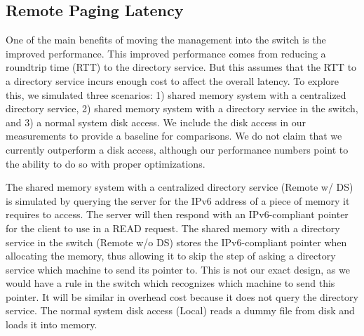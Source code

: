 \subsection{Remote Paging Latency}
One of the main benefits of moving the management into the switch is the improved performance. This improved performance comes from reducing a roundtrip time (RTT) to the directory service. But this assumes that the RTT to a directory service incurs enough cost to affect the overall latency. To explore this, we simulated three scenarios: 1) shared memory system with a centralized directory service, 2) shared memory system with a directory service in the switch, and 3) a normal system disk access. We include the disk access in our measurements to provide a baseline for comparisons. We do not claim that we currently outperform a disk access, although our performance numbers point to the ability to do so with proper optimizations.

The shared memory system with a centralized directory service (Remote w/ DS) is simulated by querying the server for the IPv6 address of a piece of memory it requires to access. The server will then respond with an IPv6-compliant pointer for the client to use in a READ request. The shared memory with a directory service in the switch (Remote w/o DS) stores the IPv6-compliant pointer when allocating the memory, thus allowing it to skip the step of asking a directory service which machine to send its pointer to. This is not our exact design, as we would have a rule in the switch which recognizes which machine to send this pointer. It will be similar in overhead cost because it does not query the directory service. 
The normal system disk access (Local) reads a dummy file from disk and loads it into memory. 

